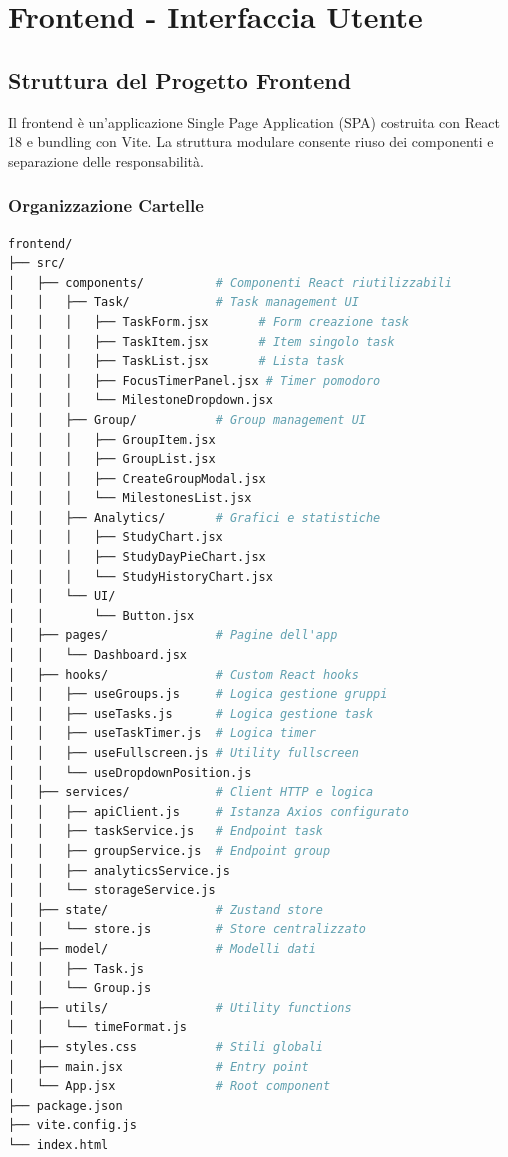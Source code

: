 \documentclass[12pt,a4paper]{report}
\begin{document}
\newpage

\chapter{Frontend - Interfaccia Utente}

\section{Struttura del Progetto Frontend}

Il frontend è un'applicazione Single Page Application (SPA) costruita con React 18 e bundling con Vite. La struttura modulare consente riuso dei componenti e separazione delle responsabilità.

\subsection{Organizzazione Cartelle}

\begin{lstlisting}[language=bash]
frontend/
├── src/
│   ├── components/          # Componenti React riutilizzabili
│   │   ├── Task/            # Task management UI
│   │   │   ├── TaskForm.jsx       # Form creazione task
│   │   │   ├── TaskItem.jsx       # Item singolo task
│   │   │   ├── TaskList.jsx       # Lista task
│   │   │   ├── FocusTimerPanel.jsx # Timer pomodoro
│   │   │   └── MilestoneDropdown.jsx
│   │   ├── Group/           # Group management UI
│   │   │   ├── GroupItem.jsx
│   │   │   ├── GroupList.jsx
│   │   │   ├── CreateGroupModal.jsx
│   │   │   └── MilestonesList.jsx
│   │   ├── Analytics/       # Grafici e statistiche
│   │   │   ├── StudyChart.jsx
│   │   │   ├── StudyDayPieChart.jsx
│   │   │   └── StudyHistoryChart.jsx
│   │   └── UI/
│   │       └── Button.jsx
│   ├── pages/               # Pagine dell'app
│   │   └── Dashboard.jsx
│   ├── hooks/               # Custom React hooks
│   │   ├── useGroups.js     # Logica gestione gruppi
│   │   ├── useTasks.js      # Logica gestione task
│   │   ├── useTaskTimer.js  # Logica timer
│   │   ├── useFullscreen.js # Utility fullscreen
│   │   └── useDropdownPosition.js
│   ├── services/            # Client HTTP e logica
│   │   ├── apiClient.js     # Istanza Axios configurato
│   │   ├── taskService.js   # Endpoint task
│   │   ├── groupService.js  # Endpoint group
│   │   ├── analyticsService.js
│   │   └── storageService.js
│   ├── state/               # Zustand store
│   │   └── store.js         # Store centralizzato
│   ├── model/               # Modelli dati
│   │   ├── Task.js
│   │   └── Group.js
│   ├── utils/               # Utility functions
│   │   └── timeFormat.js
│   ├── styles.css           # Stili globali
│   ├── main.jsx             # Entry point
│   └── App.jsx              # Root component
├── package.json
├── vite.config.js
└── index.html
\end{lstlisting}
\end{document}
